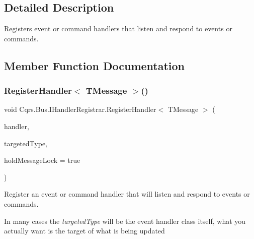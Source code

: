 \subsection{Detailed Description}
Registers event or command handlers that listen and respond to events or commands. 



\subsection{Member Function Documentation}
\mbox{\label{interfaceCqrs_1_1Bus_1_1IHandlerRegistrar_ab6ca4dfdc54a5aeebe4651dbdb479f55}} 
\subsubsection{\texorpdfstring{Register\+Handler$<$ T\+Message $>$()}{RegisterHandler< TMessage >()}\hspace{0.1cm}{\footnotesize\ttfamily [1/2]}}
{\footnotesize\ttfamily void Cqrs.\+Bus.\+I\+Handler\+Registrar.\+Register\+Handler$<$ T\+Message $>$ (\begin{DoxyParamCaption}\item[{Action$<$ T\+Message $>$}]{handler,  }\item[{Type}]{targeted\+Type,  }\item[{bool}]{hold\+Message\+Lock = {\ttfamily true} }\end{DoxyParamCaption})}



Register an event or command handler that will listen and respond to events or commands. 

In many cases the {\itshape targeted\+Type}  will be the event handler class itself, what you actually want is the target of what is being updated 

